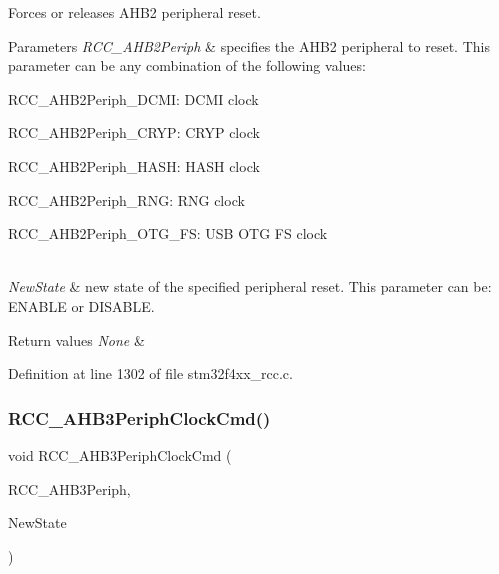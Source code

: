 Forces or releases A\+H\+B2 peripheral reset. 


\begin{DoxyParams}{Parameters}
{\em R\+C\+C\+\_\+\+A\+H\+B2\+Periph} & specifies the A\+H\+B2 peripheral to reset. This parameter can be any combination of the following values\+: \begin{DoxyItemize}
\item R\+C\+C\+\_\+\+A\+H\+B2\+Periph\+\_\+\+D\+C\+MI\+: D\+C\+MI clock \item R\+C\+C\+\_\+\+A\+H\+B2\+Periph\+\_\+\+C\+R\+YP\+: C\+R\+YP clock \item R\+C\+C\+\_\+\+A\+H\+B2\+Periph\+\_\+\+H\+A\+SH\+: H\+A\+SH clock \item R\+C\+C\+\_\+\+A\+H\+B2\+Periph\+\_\+\+R\+NG\+: R\+NG clock \item R\+C\+C\+\_\+\+A\+H\+B2\+Periph\+\_\+\+O\+T\+G\+\_\+\+FS\+: U\+SB O\+TG FS clock \end{DoxyItemize}
\\
\hline
{\em New\+State} & new state of the specified peripheral reset. This parameter can be\+: E\+N\+A\+B\+LE or D\+I\+S\+A\+B\+LE. \\
\hline
\end{DoxyParams}

\begin{DoxyRetVals}{Return values}
{\em None} & \\
\hline
\end{DoxyRetVals}


Definition at line 1302 of file stm32f4xx\+\_\+rcc.\+c.

\mbox{\label{group___r_c_c___group3_ga4eb8c119f2e9bf2bd2e042d27f151338}} 
\subsubsection{\texorpdfstring{R\+C\+C\+\_\+\+A\+H\+B3\+Periph\+Clock\+Cmd()}{RCC\_AHB3PeriphClockCmd()}}
{\footnotesize\ttfamily void R\+C\+C\+\_\+\+A\+H\+B3\+Periph\+Clock\+Cmd (\begin{DoxyParamCaption}\item[{uint32\+\_\+t}]{R\+C\+C\+\_\+\+A\+H\+B3\+Periph,  }\item[{Functional\+State}]{New\+State }\end{DoxyParamCaption})}



